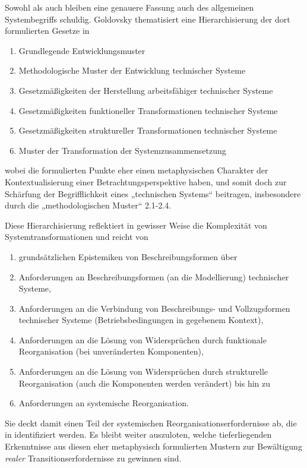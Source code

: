 \documentclass[11pt,a4paper]{article}
\begin{document}
Sowohl \cite{Goldovsky1983} als auch \cite{Rubin2019} bleiben eine genauere
Fassung auch des allgemeinen Systembegriffs schuldig. Goldovsky thematisiert
eine Hierarchisierung der dort formulierten Gesetze in
\begin{enumerate}[noitemsep]
\item Grundlegende Entwicklungsmuster
\item Methodologische Muster der Entwicklung technischer Systeme
\item Gesetzmäßigkeiten der Herstellung arbeitsfähiger technischer Systeme
\item Gesetzmäßigkeiten funktioneller Transformationen technischer Systeme
\item Gesetzmäßigkeiten struktureller Transformationen technischer Systeme
\item Muster der Transformation der Systemzusammensetzung
\end{enumerate}
wobei die formulierten Punkte eher einen metaphysischen Charakter der
Kontextualisierung einer Betrachtungsperspektive haben, und somit doch zur
Schärfung der Begriff\-lichkeit eines „technischen Systems“ beitragen,
insbesondere durch die „methodologischen Muster“ 2.1-2.4.

Diese Hierarchisierung reflektiert in gewisser Weise die Komplexität von
Systemtransformationen und reicht von
\begin{enumerate}[noitemsep]
\item grundsätzlichen Epistemiken von Beschreibungsformen über
\item Anforderungen an Beschreibungsformen (an die Modellierung) technischer
  Systeme,
\item Anforderungen an die Verbindung von Beschreibungs- und Vollzugsformen
  technischer Systeme (Betriebsbedingungen in gegebenem Kontext),
\item Anforderungen an die Lösung von Widersprüchen durch funktionale
  Reorganisation (bei unveränderten Komponenten),
\item Anforderungen an die Lösung von Widersprüchen durch strukturelle
  Reorganisation (auch die Komponenten werden verändert) bis hin zu
\item Anforderungen an systemische Reorganisation.
\end{enumerate}

Sie deckt damit einen Teil der systemischen Reorganisationserfordernisse ab,
die in \cite{Geels2007} identifiziert werden. Es bleibt weiter auszuloten,
welche tieferliegenden Erkenntnisse aus diesen eher metaphysisch formulierten
Mustern zur Bewältigung \emph{realer} Transitionserfordernisse zu gewinnen
sind.
\end{document}
